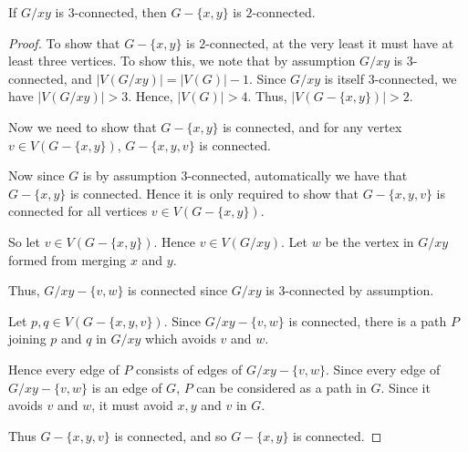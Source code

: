 \documentclass{unswmaths}
\begin{document}
\begin{proposition}[Part (a)]
    If $G/xy$ is $3$-connected, then $G - \{x,y\}$ is $2$-connected.
\end{proposition}
\begin{proof}
    To show that $G-\{x,y\}$ is $2$-connected, at the very least it must have at
    least three vertices. To show this, we note that by assumption $G/xy$ is $3$-connected,
    and $|V(G/xy)| = |V(G)|-1$. Since $G/xy$ is itself $3$-connected, we have $|V(G/xy)| > 3$.
    Hence, $|V(G)| > 4$. Thus, $|V(G-\{x,y\})| > 2$. 
    
    Now we need to show that $G-\{x,y\}$ is connected, and for any vertex $v \in V(G-\{x,y\})$,
    $G-\{x,y,v\}$ is connected. 
    
    Now since $G$ is by assumption $3$-connected, automatically we have that $G-\{x,y\}$ is connected.
    Hence it is only required to show that $G-\{x,y,v\}$ is connected for all
    vertices $v \in V(G-\{x,y\})$. 
    
    So let $v \in V(G-\{x,y\})$. Hence $v \in V(G/xy)$.
    Let $w$ be the vertex in $G/xy$ formed from merging $x$ and $y$.
    
    Thus, $G/xy-\{v,w\}$ is connected since $G/xy$ is $3$-connected by assumption.
    
    Let $p,q \in V(G-\{x,y,v\})$. Since $G/xy-\{v,w\}$ is connected,
    there is a path $P$ joining $p$ and $q$ in $G/xy$ which avoids $v$ and $w$. 
    
    Hence every edge of $P$ consists of edges of $G/xy-\{v,w\}$. 
    Since every edge of $G/xy-\{v,w\}$ is an edge of $G$, $P$
    can be considered as a path in $G$. Since it avoids $v$ and $w$, it 
    must avoid $x,y$ and $v$ in $G$.     
    
    Thus $G-\{x,y,v\}$ is
    connected, and so $G-\{x,y\}$ is connected. 
\end{proof}
\end{document}
